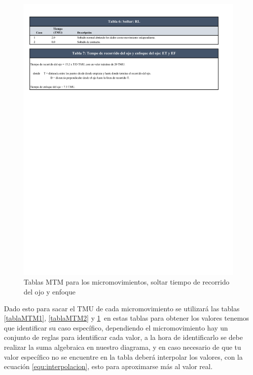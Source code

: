     
    \begin{figure}[H]
        \centering
        \includegraphics[trim = {5mm 100mm 1mm 1mm},clip,scale=0.4]{22/Img/tablasMTM3.pdf}
        \caption{Tablas MTM para los micromovimientos, soltar tiempo de recorrido del ojo y enfoque }
        \label{tablaMTM3}
    \end{figure}
    
    
    Dado esto para sacar el TMU de cada micromovimiento se utilizará las tablas \ref{tablaMTM1}, \ref{tablaMTM2} y \ref{tablaMTM3}\, en estas tablas para obtener los valores tenemos que identificar su caso específico, dependiendo el micromovimiento hay un conjunto de reglas para identificar cada valor, a la hora de identificarlo se debe realizar la suma algebraica en nuestro diagrama, y en caso necesario de que tu valor específico no se encuentre en la tabla deberá interpolar los valores, con la ecuación \ref{equ:interpolacion}, esto para aproximarse más al valor real.
    
    
    
